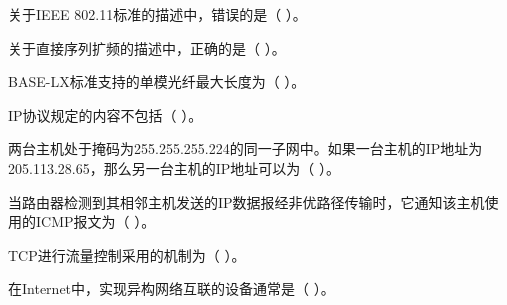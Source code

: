 \begin{qitems}[startnum=41]
\begin{bbox}
\qitem 关于IEEE 802.11标准的描述中，错误的是（ ）。\par
{}
\end{bbox}

\begin{bbox}
\qitem 关于直接序列扩频的描述中，正确的是（ ）。\par
{}
\end{bbox}

\begin{bbox}
 BASE-LX标准支持的单模光纤最大长度为（ ）。\par
{}
\end{bbox}

\begin{bbox}
\qitem IP协议规定的内容不包括（ ）。\par
{}
\end{bbox}

\begin{bbox}
\qitem 两台主机处于掩码为255.255.255.224的同一子网中。如果一台主机的IP地址为205.113.28.65，那么另一台主机的IP地址可以为（ ）。\par
{}
\end{bbox}

\begin{bbox}
\qitem 当路由器检测到其相邻主机发送的IP数据报经非优路径传输时，它通知该主机使用的ICMP报文为（ ）。\par
{}
\end{bbox}

\begin{bbox}
\qitem TCP进行流量控制采用的机制为（ ）。\par
{}
\end{bbox}

\begin{bbox}
\qitem 在Internet中，实现异构网络互联的设备通常是（ ）。\par
{}
\end{bbox}


\end{qitems}
